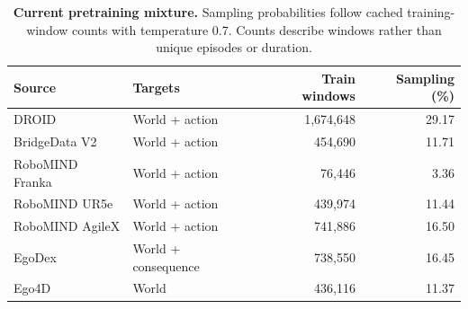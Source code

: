 \begin{table}[H]
\centering\small
\begin{tabularx}{\linewidth}{@{}lYRR@{}}
\toprule
Source & Targets & Train windows & Sampling (\%) \\
\midrule
{}
DROID & World + action & 1,674,648 & 29.17 \\
BridgeData V2 & World + action & 454,690 & 11.71 \\
RoboMIND Franka & World + action & 76,446 & 3.36 \\
RoboMIND UR5e & World + action & 439,974 & 11.44 \\
RoboMIND AgileX & World + action & 741,886 & 16.50 \\
EgoDex & World + consequence & 738,550 & 16.45 \\
Ego4D & World & 436,116 & 11.37 \\
\bottomrule
\end{tabularx}
\caption{\textbf{Current pretraining mixture.} Sampling probabilities follow cached training-window counts with temperature 0.7. Counts describe windows rather than unique episodes or duration.}
\label{tab:corpus}
\end{table}
